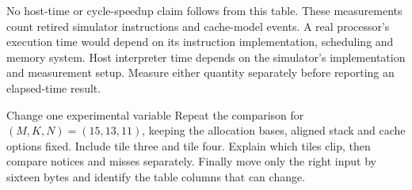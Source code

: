 No host-time or cycle-speedup claim follows from this table. These measurements
count retired simulator instructions and cache-model events. A real processor's
execution time would depend on its instruction implementation, scheduling and memory
system. Host interpreter time depends on the simulator's implementation and measurement
setup. Measure either quantity separately before reporting an elapsed-time result.

\begin{MARSExercise}{Change one experimental variable}
  Repeat the comparison for \((M,K,N)=(15,13,11)\), keeping the allocation bases,
  aligned stack and cache options fixed. Include tile three and tile four. Explain
  which tiles clip, then compare notices and misses separately. Finally move only the
  right input by sixteen bytes and identify the table columns that can change.
\end{MARSExercise}
